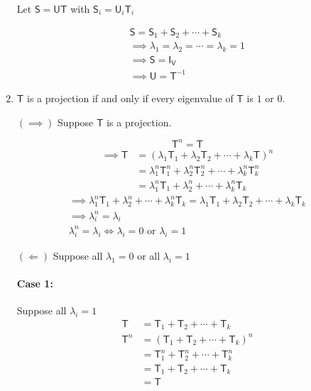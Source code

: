 \begin{enumerate}
Let $\mathsf{S} = \mathsf{U}\mathsf{T}$ with $\mathsf{S}_i =
\mathsf{U}_i\mathsf{T}_i$

\begin{gather}
\mathsf{S} = \mathsf{S}_1 + \mathsf{S}_2 + \dotsb + \mathsf{S}_k\\
\implies \lambda_1 = \lambda_2 = \dotsb = \lambda_k = 1\\
\implies \mathsf{S} = \mathsf{I}_\mathsf{V}\\
\implies \mathsf{U} = \mathsf{T}^{-1}
\end{gather}

\item $\mathsf{T}$ is a projection if and only if every eigenvalue of
  $\mathsf{T}$ is $1$ or $0.$

$(\implies)$ Suppose $\mathsf{T}$ is a projection.

\begin{equation}
\mathsf{T}^n = \mathsf{T}
\end{equation}
\begin{align}
\implies \mathsf{T} &= \left(\lambda_1\mathsf{T}_1 +
  \lambda_2\mathsf{T}_2 + \dotsb + \lambda_k\mathsf{T}\right)^n\\
&= \lambda_1^n\mathsf{T}_1^n + \lambda_2^n\mathsf{T}_2^n + \dotsb +
\lambda_k^n\mathsf{T}_k^n\\
&= \lambda_1^n\mathsf{T}_1 + \lambda_2^n + \dotsb +
\lambda_k^n\mathsf{T}_k
\end{align}
\begin{gather}
\implies \lambda_1^n\mathsf{T}_1 + \lambda_2^n + \dotsb +
\lambda_k^n\mathsf{T}_k = \lambda_1\mathsf{T}_1 +
\lambda_2\mathsf{T}_2 + \dotsb + \lambda_k\mathsf{T}_k\\
\implies \lambda_i^n = \lambda_i \\
\lambda_i^n = \lambda_i  \Leftrightarrow \lambda_i =0 \text{ or } \lambda_i = 1
\end{gather}

$(\Leftarrow)$ Suppose all $\lambda_1 = 0$ or all $\lambda_i = 1$

\paragraph{Case 1:} Suppose all $\lambda_i =1$ 
\begin{align}
\mathsf{T} &= \mathsf{T}_1 + \mathsf{T}_2 + \dotsb + \mathsf{T}_k\\
\mathsf{T}^n &= \left(\mathsf{T}_1 + \mathsf{T}_2 + \dotsb +
  \mathsf{T}_k \right)^n\\ 
&= \mathsf{T}_1^n + \mathsf{T}_2^n + \dotsb + \mathsf{T}_k^n\\
&= \mathsf{T}_1 + \mathsf{T}_2 + \dotsb + \mathsf{T}_k\\
&= \mathsf{T}
\end{align}


\end{enumerate}
